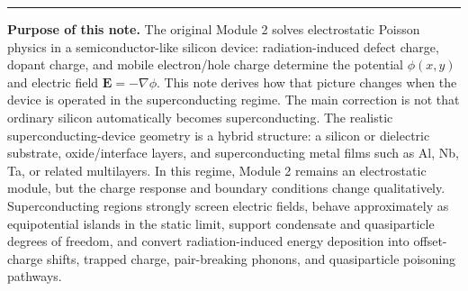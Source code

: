 \documentclass[11pt]{article}
\newcommand{\Evec}{\mathbf{E}}
\begin{document}

\hrule
\vspace{0.8em}

\begin{overviewbox}
\textbf{Purpose of this note.} The original Module 2 solves electrostatic Poisson physics in a semiconductor-like silicon device: radiation-induced defect charge, dopant charge, and mobile electron/hole charge determine the potential $\phi(x,y)$ and electric field $\Evec=-\nabla\phi$. This note derives how that picture changes when the device is operated in the superconducting regime. The main correction is not that ordinary silicon automatically becomes superconducting. The realistic superconducting-device geometry is a hybrid structure: a silicon or dielectric substrate, oxide/interface layers, and superconducting metal films such as Al, Nb, Ta, or related multilayers. In this regime, Module 2 remains an electrostatic module, but the charge response and boundary conditions change qualitatively. Superconducting regions strongly screen electric fields, behave approximately as equipotential islands in the static limit, support condensate and quasiparticle degrees of freedom, and convert radiation-induced energy deposition into offset-charge shifts, trapped charge, pair-breaking phonons, and quasiparticle poisoning pathways.
\end{overviewbox}

\ProjectTOC

\SymbolsAcronymsSection
\end{document}

